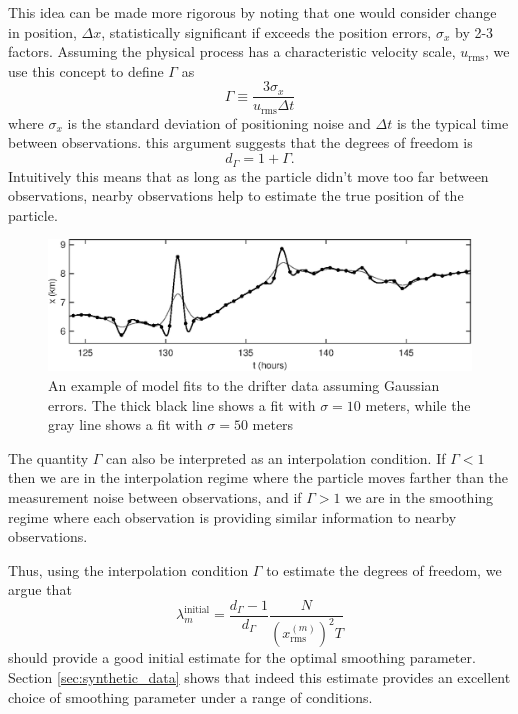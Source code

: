 \documentclass[10pt,journal]{IEEEtran}
\begin{document}
This idea can be made more rigorous by noting that one would consider change in position, $\Delta x$, statistically significant if exceeds the position errors, $\sigma_x$ by 2-3 factors. Assuming the physical process has a characteristic velocity scale, $u_{\textrm{rms}}$, we use this concept to define $\Gamma$ as
\begin{equation}
\label{gamma_equation}
\Gamma \equiv \frac{3 \sigma_x}{u_{\textrm{rms}}\Delta t}
\end{equation}
where $\sigma_x$ is the standard deviation of positioning noise and $\Delta t$ is the typical time between observations. this argument suggests that the degrees of freedom is 
\begin{equation}
d_\Gamma = 1 + \Gamma.
\end{equation}
Intuitively this means that as long as the particle didn't move too far between observations, nearby observations help to estimate the true position of the particle.

\begin{figure}[t]
  \centerline{\includegraphics[width=39pc,angle=0]{figures/gaussianfit}}
  
  \caption{An example of model fits to the drifter data assuming Gaussian errors. The thick black line shows a fit with $\sigma=10$ meters, while the gray line shows a fit with $\sigma=50$ meters}
  \label{gaussianfit}
\end{figure}

The quantity $\Gamma$ can also be interpreted as an interpolation condition. If $\Gamma<1$ then we are in the interpolation regime where the particle moves farther than the measurement noise between observations, and if $\Gamma >1$ we are in the smoothing regime where each observation is providing similar information to nearby observations.

Thus, using the interpolation condition $\Gamma$ to estimate the degrees of freedom, we argue that
\begin{equation}
\label{lambda_initial_guess}
\lambda^{\textrm{initial}}_m = \frac{d_\Gamma-1}{d_\Gamma} \frac{N}{ \left(x^{(m)}_{\textrm{rms}}\right)^2  T}
\end{equation}
should provide a good initial estimate for the optimal smoothing parameter. Section \ref{sec:synthetic_data} shows that indeed this estimate provides an excellent choice of smoothing parameter under a range of conditions.
\end{document}
